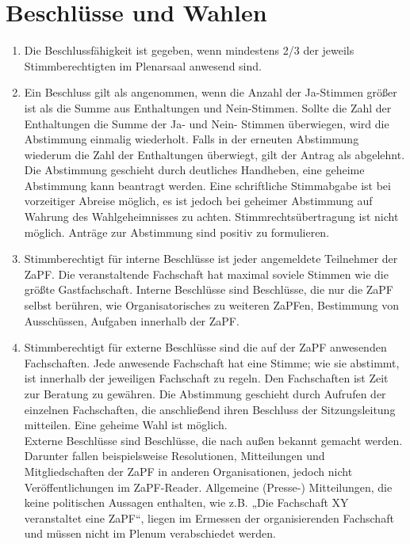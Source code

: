 \section*{Beschlüsse und Wahlen}
\begin{enumerate}
\item{Die Beschlussfähigkeit ist gegeben, wenn mindestens 2/3 der jeweils Stimmberechtigten im
Plenarsaal anwesend sind.}

\item{Ein Beschluss gilt als angenommen, wenn die Anzahl der Ja-Stimmen größer ist als die Summe aus
Enthaltungen und Nein-Stimmen. Sollte die Zahl der Enthaltungen die Summe der Ja- und Nein-
Stimmen überwiegen, wird die Abstimmung einmalig wiederholt. Falls in der erneuten Abstimmung
wiederum die Zahl der Enthaltungen überwiegt, gilt der Antrag als abgelehnt. Die Abstimmung
geschieht durch deutliches Handheben, eine geheime Abstimmung kann beantragt werden. Eine
schriftliche Stimmabgabe ist bei vorzeitiger Abreise möglich, es ist jedoch bei geheimer
Abstimmung auf Wahrung des Wahlgeheimnisses zu achten. Stimmrechtsübertragung ist nicht
möglich. Anträge zur Abstimmung sind positiv zu formulieren.}

\item{Stimmberechtigt für interne Beschlüsse ist jeder angemeldete Teilnehmer der ZaPF. Die
veranstaltende Fachschaft hat maximal soviele Stimmen wie die größte Gastfachschaft. Interne
Beschlüsse sind Beschlüsse, die nur die ZaPF selbst berühren, wie Organisatorisches zu weiteren
ZaPFen, Bestimmung von Ausschüssen, Aufgaben innerhalb der ZaPF.}

\item{Stimmberechtigt für externe Beschlüsse sind die auf der ZaPF anwesenden Fachschaften. Jede
anwesende Fachschaft hat eine Stimme; wie sie abstimmt, ist innerhalb der jeweiligen Fachschaft zu
regeln. Den Fachschaften ist Zeit zur Beratung zu gewähren. Die Abstimmung geschieht durch
Aufrufen der einzelnen Fachschaften, die anschließend ihren Beschluss der Sitzungsleitung
mitteilen. Eine geheime Wahl ist möglich.\\
Externe Beschlüsse sind Beschlüsse, die nach außen bekannt gemacht werden. Darunter fallen
beispielsweise Resolutionen, Mitteilungen und Mitgliedschaften der ZaPF in anderen
Organisationen, jedoch nicht Veröffentlichungen im ZaPF-Reader. Allgemeine (Presse-)
Mitteilungen, die keine politischen Aussagen enthalten, wie z.B. „Die Fachschaft XY veranstaltet
eine ZaPF“, liegen im Ermessen der organisierenden Fachschaft und müssen nicht im Plenum
verabschiedet werden.}


\end{enumerate}
